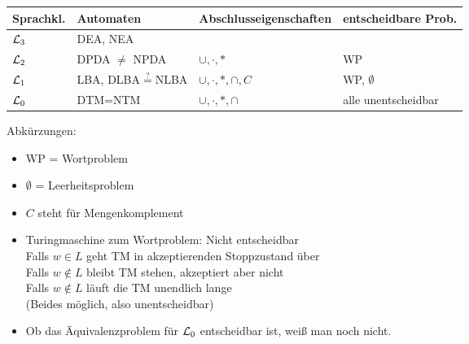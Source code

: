 \begin{tabular}{l|l|l|l}
	Sprachkl. & Automaten & Abschlusseigenschaften & entscheidbare Prob.\\ \hline
	$\mathcal{L}_3$ & DEA, NEA & \\
	$\mathcal{L}_2$ & DPDA $\neq$ NPDA & $\cup,\cdot,\ast$ & WP\\
	$\mathcal{L}_1$ & LBA, DLBA$\overset{?}{=}$NLBA & $\cup,\cdot,\ast,\cap,C$ & WP, $\emptyset$\\
	$\mathcal{L}_0$ & DTM=NTM & $\cup,\cdot,\ast,\cap$ & alle unentscheidbar\\ 
\end{tabular}

Abkürzungen:
\begin{itemize}
	\item WP = Wortproblem
	\item $\emptyset$ = Leerheitsproblem
	\item $C$ steht für Mengenkomplement
\end{itemize}

\begin{itemize}
	\item Turingmaschine zum Wortproblem: Nicht entscheidbar\\
	Falls $w\in L$ geht TM in akzeptierenden Stoppzustand über\\
	Falls $w\not\in L$ bleibt TM stehen, akzeptiert aber nicht\\
	Falls $w\not\in L$ läuft die TM unendlich lange\\
	(Beides möglich, also unentscheidbar)
	\item Ob das Äquivalenzproblem für $\mathcal{L}_0$ entscheidbar ist, weiß man noch nicht.
\end{itemize}